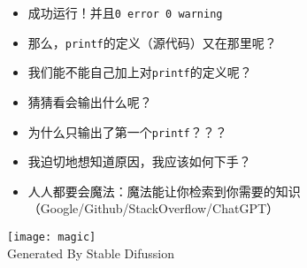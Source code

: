 \documentclass{ctexbeamer} %
\begin{document}
\begin{frame}[fragile]
	

	\begin{itemize}
		\item 成功运行！并且\texttt{0 error 0 warning}
		\item 那么，\texttt{printf}的定义（源代码）又在那里呢？
		\item 我们能不能自己加上对\texttt{printf}的定义呢？
	\end{itemize}
\end{frame}

\begin{frame}[fragile]
	

	\begin{itemize}
		\item 猜猜看会输出什么呢？\pause
		\item 为什么只输出了第一个\texttt{printf}？？？
		\item 我迫切地想知道原因，我应该如何下手？
	\end{itemize}
\end{frame}

\begin{frame}
	\begin{itemize}
		\item 人人都要会魔法：魔法能让你检索到你需要的知识（Google/Github/StackOverflow/ChatGPT）
	\end{itemize}
	\begin{center}
		\texttt{[image: magic]}\\
		\small{Generated By Stable Difussion}
	\end{center}
\end{frame}
\end{document}
